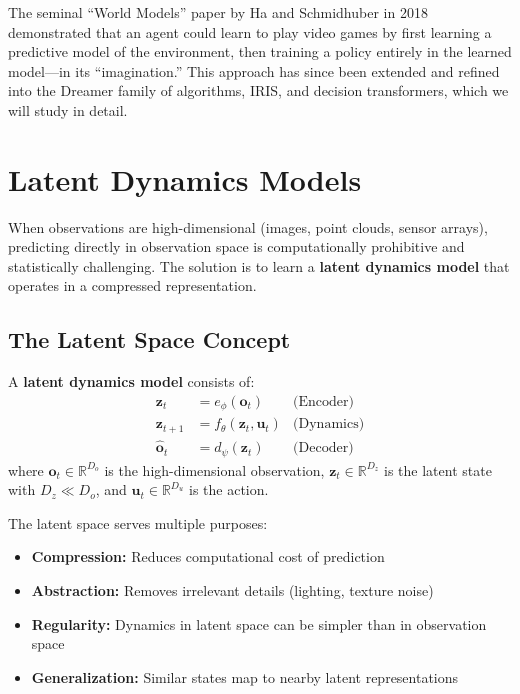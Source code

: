 The seminal ``World Models'' paper by Ha and Schmidhuber in 2018 demonstrated that an agent could learn to play video games by first learning a predictive model of the environment, then training a policy entirely in the learned model---in its ``imagination.'' This approach has since been extended and refined into the Dreamer family of algorithms, IRIS, and decision transformers, which we will study in detail.

\section{Latent Dynamics Models}
\label{sec:latent_dynamics}

When observations are high-dimensional (images, point clouds, sensor arrays), predicting directly in observation space is computationally prohibitive and statistically challenging. The solution is to learn a \textbf{latent dynamics model} that operates in a compressed representation.

\subsection{The Latent Space Concept}

\begin{definition}
A \textbf{latent dynamics model} consists of:
\begin{align}
\mathbf{z}_t &= e_\phi(\mathbf{o}_t) & \text{(Encoder)} \\
\mathbf{z}_{t+1} &= f_\theta(\mathbf{z}_t, \mathbf{u}_t) & \text{(Dynamics)} \\
\hat{\mathbf{o}}_t &= d_\psi(\mathbf{z}_t) & \text{(Decoder)}
\end{align}
where $\mathbf{o}_t \in \mathbb{R}^{D_o}$ is the high-dimensional observation, $\mathbf{z}_t \in \mathbb{R}^{D_z}$ is the latent state with $D_z \ll D_o$, and $\mathbf{u}_t \in \mathbb{R}^{D_u}$ is the action.
\end{definition}

The latent space serves multiple purposes:
\begin{itemize}
    \item \textbf{Compression:} Reduces computational cost of prediction
    \item \textbf{Abstraction:} Removes irrelevant details (lighting, texture noise)
    \item \textbf{Regularity:} Dynamics in latent space can be simpler than in observation space
    \item \textbf{Generalization:} Similar states map to nearby latent representations
\end{itemize}

